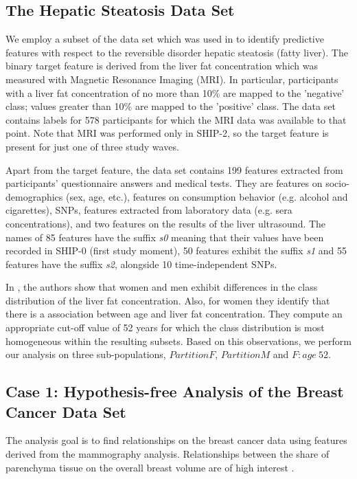 \documentclass[journal]{style/vgtc} 			          %
\begin{document}
\subsection{The Hepatic Steatosis Data Set}
We employ a subset of the data set which was used in \cite{Niemann2014} to identify predictive features with respect to the reversible disorder hepatic steatosis (fatty liver).
The binary target feature is derived from the liver fat concentration which was measured with Magnetic Resonance Imaging (MRI).
In particular, participants with a liver fat concentration of no more than 10\% are mapped to the 'negative' class; values greater than 10\% are mapped to the 'positive' class.
The data set contains labels for 578 participants for which the MRI data was available to that point.
Note that MRI was performed only in SHIP-2, so the target feature is present for just one of three study waves.

Apart from the target feature, the data set contains 199 features extracted from participants' questionnaire answers and medical tests.
They are features on socio-demographics (sex, age, etc.), features on consumption behavior (e.g. alcohol and cigarettes), SNPs, features extracted from laboratory data (e.g. sera concentrations), and two features on the results of the liver ultrasound.
The names of 85 features have the suffix \emph{s0} meaning that their values have been recorded in SHIP-0 (first study moment), 50 features exhibit the suffix \emph{s1} and 55 features have the suffix \emph{s2}, alongside 10 time-independent SNPs.

In \cite{Niemann2014}, the authors show that women and men exhibit differences in the class distribution of the liver fat concentration.
Also, for women they identify that there is a association between age and liver fat concentration.
They compute an appropriate cut-off value of 52 years for which the class distribution is most homogeneous within the resulting subsets.
Based on this observations, we perform our analysis on three sub-populations, $PartitionF$, $PartitionM$ and \emph{$F:age\>52$}.
\subsection{Case 1: Hypothesis-free Analysis of the Breast Cancer Data Set}
The analysis goal is to find relationships on the breast cancer data using features derived from the mammography analysis.
Relationships between the share of parenchyma tissue on the overall breast volume are of high interest \cite{Mccormack2006}.
\end{document}
